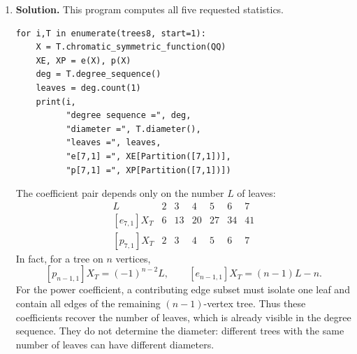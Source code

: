 \documentclass{article}
\begin{document}
\begin{enumerate}
\item \textbf{Solution.}
This program computes all five requested statistics.
\begin{verbatim}
for i,T in enumerate(trees8, start=1):
    X = T.chromatic_symmetric_function(QQ)
    XE, XP = e(X), p(X)
    deg = T.degree_sequence()
    leaves = deg.count(1)
    print(i,
          "degree sequence =", deg,
          "diameter =", T.diameter(),
          "leaves =", leaves,
          "e[7,1] =", XE[Partition([7,1])],
          "p[7,1] =", XP[Partition([7,1])])
\end{verbatim}
The coefficient pair depends only on the number $L$ of leaves:
\[
\begin{array}{c|rrrrrr}
L&2&3&4&5&6&7\\ \hline
{[e_{7,1}]X_T}&6&13&20&27&34&41\\
{[p_{7,1}]X_T}&2&3&4&5&6&7
\end{array}
\]
In fact, for a tree on $n$ vertices,
\[
[p_{n-1,1}]X_T=(-1)^{n-2}L,\qquad
[e_{n-1,1}]X_T=(n-1)L-n.
\]
For the power coefficient, a contributing edge subset must isolate one
leaf and contain all edges of the remaining $(n-1)$-vertex tree.
Thus these coefficients recover the number of leaves, which is already
visible in the degree sequence.  They do not determine the diameter:
different trees with the same number of leaves can have different
diameters.
\end{enumerate}
\end{document}
